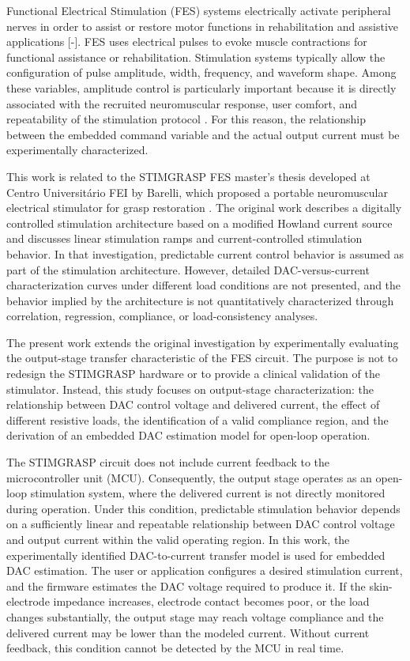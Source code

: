 \documentclass[conference]{IEEEtran}
\begin{document}
Functional Electrical Stimulation (FES) systems electrically activate peripheral nerves in order to assist or restore motor functions in rehabilitation and assistive applications [-]. FES uses electrical pulses to evoke muscle contractions for functional assistance or rehabilitation. Stimulation systems typically allow the configuration of pulse amplitude, width, frequency, and waveform shape. Among these variables, amplitude control is particularly important because it is directly associated with the recruited neuromuscular response, user comfort, and repeatability of the stimulation protocol \cite{CURRENT_CONTROLLED_STIMULATION}. For this reason, the relationship between the embedded command variable and the actual output current must be experimentally characterized.


This work is related to the STIMGRASP FES master's thesis developed at Centro Universitário FEI by Barelli, which proposed a portable neuromuscular electrical stimulator for grasp restoration \cite{STIMGRASP_THESIS}. The original work describes a digitally controlled stimulation architecture based on a modified Howland current source and discusses linear stimulation ramps and current-controlled stimulation behavior. In that investigation, predictable current control behavior is assumed as part of the stimulation architecture. However, detailed DAC-versus-current characterization curves under different load conditions are not presented, and the behavior implied by the architecture is not quantitatively characterized through correlation, regression, compliance, or load-consistency analyses.

The present work extends the original investigation by experimentally evaluating the output-stage transfer characteristic of the FES circuit. The purpose is not to redesign the STIMGRASP hardware or to provide a clinical validation of the stimulator. Instead, this study focuses on output-stage characterization: the relationship between DAC control voltage and delivered current, the effect of different resistive loads, the identification of a valid compliance region, and the derivation of an embedded DAC estimation model for open-loop operation.

The STIMGRASP circuit does not include current feedback to the microcontroller unit (MCU). Consequently, the output stage operates as an open-loop stimulation system, where the delivered current is not directly monitored during operation. Under this condition, predictable stimulation behavior depends on a sufficiently linear and repeatable relationship between DAC control voltage and output current within the valid operating region. In this work, the experimentally identified DAC-to-current transfer model is used for embedded DAC estimation. The user or application configures a desired stimulation current, and the firmware estimates the DAC voltage required to produce it. If the skin-electrode impedance increases, electrode contact becomes poor, or the load changes substantially, the output stage may reach voltage compliance and the delivered current may be lower than the modeled current. Without current feedback, this condition cannot be detected by the MCU in real time.
\end{document}
